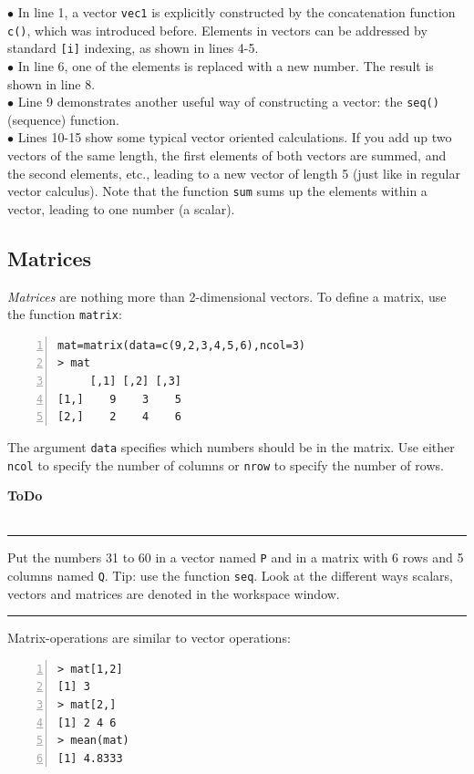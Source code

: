 \documentclass[a4paper,11pt,twocolumn,tablecaptionabove]{scrartcl} %
\newenvironment{ToDo} {%
  \begin{flushright}
    \hfill
    \begin{minipage}{0.95\columnwidth}         %
    \textsf{\textbf{ToDo}} \\
      \vspace{-0.85cm}\\
      {\color{Gray}\rule[-0.1cm]{\columnwidth}{1.5pt}}} { %
      {\color{Gray} \rule[0.3cm]{\columnwidth}{1.5pt}}
    \end{minipage}
    \vspace{1em}
  \end{flushright}
  }
\begin{document}
\noindent $\bullet$  In line 1, a vector \texttt{vec1} is explicitly constructed by the concatenation function \texttt{c()}, which was introduced before. Elements in vectors can be addressed by standard \texttt{[i]} indexing, as shown in lines 4-5. \\
\noindent $\bullet$  In line 6, one of the elements is replaced with a new number. The result is shown in line 8.\\
\noindent $\bullet$ Line 9 demonstrates another useful way of constructing a vector: the \texttt{seq()} (sequence) function. \\
\noindent $\bullet$ Lines 10-15 show some typical vector oriented calculations. If you add up two vectors of the same length, the first elements of both vectors are summed, and the second elements, etc., leading to a new vector of length 5 (just like in regular vector calculus). Note that the function \texttt{sum} sums up the elements within a vector, leading to one number (a scalar).

\subsection{Matrices}

\emph{Matrices} are nothing more than 2-dimensional vectors. To define a matrix, use the function \texttt{matrix}:
\begin{Verbatim}[frame=single,numbers=left,gobble=0, xleftmargin=0.35cm, numbersep=0.1cm]
mat=matrix(data=c(9,2,3,4,5,6),ncol=3)
> mat
     [,1] [,2] [,3]
[1,]    9    3    5
[2,]    2    4    6
\end{Verbatim}

The argument \texttt{data} specifies which numbers should be in the matrix. Use either  \texttt{ncol} to specify the number of columns or \texttt{nrow} to specify the number of rows. 

\begin{ToDo}
Put the numbers 31 to 60 in a vector named \texttt{P} and in a matrix with 6 rows and 5 columns named \texttt{Q}. Tip: use the function \texttt{seq}. Look at the different ways scalars, vectors and matrices are denoted in the workspace window.\\
\end{ToDo}
 
 Matrix-operations are similar to vector operations:

\begin{Verbatim}[frame=single,numbers=left,gobble=0, xleftmargin=0.35cm, numbersep=0.1cm]
> mat[1,2]
[1] 3
> mat[2,]
[1] 2 4 6
> mean(mat)
[1] 4.8333
\end{Verbatim}
\end{document}
